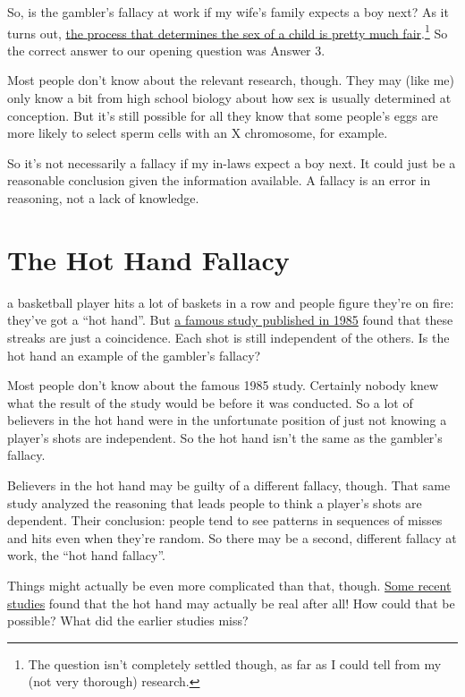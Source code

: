\documentclass[justified]{tufte-book}
\theoremstyle{definition}
\theoremstyle{definition}
\theoremstyle{definition}
\theoremstyle{remark}
\begin{document}
So, is the gambler's fallacy at work if my wife's family expects a boy next? As it turns out, \href{https://stat.duke.edu/~dalene/chance/chanceweb/144.rodgers.pdf}{the process that determines the sex of a child is pretty much fair}.\footnote{The question isn't completely settled though, as far as I could tell from my (not very thorough) research.} So the correct answer to our opening question was Answer 3.

Most people don't know about the relevant research, though. They may (like me) only know a bit from high school biology about how sex is usually determined at conception. But it's still possible for all they know that some people's eggs are more likely to select sperm cells with an X chromosome, for example.

So it's not necessarily a fallacy if my in-laws expect a boy next. It could just be a reasonable conclusion given the information available. A fallacy is an error in reasoning, not a lack of knowledge.

\hypertarget{the-hot-hand-fallacy}{%
\section{The Hot Hand Fallacy}\label{the-hot-hand-fallacy}}

 a basketball player hits a lot of baskets in a row and people figure they're on fire: they've got a ``hot hand''. But \href{http://www.sciencedirect.com/science/article/pii/0010028585900106?via\%3Dihub}{a famous study published in 1985} found that these streaks are just a coincidence. Each shot is still independent of the others. Is the hot hand an example of the gambler's fallacy?

Most people don't know about the famous 1985 study. Certainly nobody knew what the result of the study would be before it was conducted. So a lot of believers in the hot hand were in the unfortunate position of just not knowing a player's shots are independent. So the hot hand isn't the same as the gambler's fallacy.

Believers in the hot hand may be guilty of a different fallacy, though. That same study analyzed the reasoning that leads people to think a player's shots are dependent. Their conclusion: people tend to see patterns in sequences of misses and hits even when they're random. So there may be a second, different fallacy at work, the ``hot hand fallacy''.

Things might actually be even more complicated than that, though. \href{https://www.gsb.stanford.edu/insights/jeffrey-zwiebel-why-hot-hand-may-be-real-after-all}{Some recent studies} found that the hot hand may actually be real after all! How could that be possible? What did the earlier studies miss?
\end{document}
